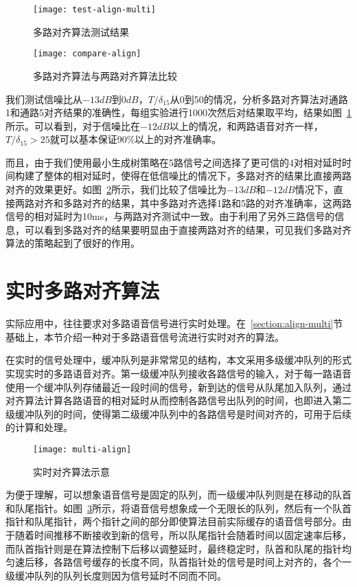 \begin{figure}
\centering
\texttt{[image: test-align-multi]}
\caption{多路对齐算法测试结果\label{fig:test-align-multi}}
\end{figure}

\begin{figure}
\centering
\texttt{[image: compare-align]}
\caption{多路对齐算法与两路对齐算法比较\label{fig:compare-align}}
\end{figure}

我们测试信噪比从$-13dB$到$0dB$，$T/\delta_{15}$从0到50的情况，分析多路对齐算法对通路1和通路5对齐结果的准确性，每组实验进行1000次然后对结果取平均，结果如图~\ref{fig:test-align-multi}所示。可以看到，对于信噪比在$-12dB$以上的情况，和两路语音对齐一样，$T/\delta_{15} > 25$就可以基本保证90\%以上的对齐准确率。

而且，由于我们使用最小生成树策略在5路信号之间选择了更可信的4对相对延时时间构建了整体的相对延时，使得在低信噪比的情况下，多路对齐的结果比直接两路对齐的效果更好。如图~\ref{fig:compare-align}所示，我们比较了信噪比为$-13dB$和$-12dB$情况下，直接两路对齐和多路对齐的结果，其中多路对齐选择1路和5路的对齐准确率，这两路信号的相对延时为10ms，与两路对齐测试中一致。由于利用了另外三路信号的信息，可以看到多路对齐的结果要明显由于直接两路对齐的结果，可见我们多路对齐算法的策略起到了很好的作用。

\section{实时多路对齐算法} \label{section:realtime-align}

实际应用中，往往要求对多路语音信号进行实时处理。在~\ref{section:align-multi}节基础上，本节介绍一种对于多路语音信号流进行实时对齐的算法。

在实时的信号处理中，缓冲队列是非常常见的结构，本文采用多级缓冲队列的形式实现实时的多路语音对齐。第一级缓冲队列接收各路信号的输入，对于每一路语音使用一个缓冲队列存储最近一段时间的信号，新到达的信号从队尾加入队列，通过对齐算法计算各路语音的相对延时从而控制各路信号出队列的时间，也即进入第二级缓冲队列的时间，使得第二级缓冲队列中的各路信号是时间对齐的，可用于后续的计算和处理。

\begin{figure}
\centering
\texttt{[image: multi-align]}
\caption{实时对齐算法示意\label{fig:multi-align}}
\end{figure}

为便于理解，可以想象语音信号是固定的队列，而一级缓冲队列则是在移动的队首和队尾指针。如图~\ref{fig:multi-align}所示，将语音信号想象成一个无限长的队列，然后有一个队首指针和队尾指针，两个指针之间的部分即使算法目前实际缓存的语音信号部分。由于随着时间推移不断接收到新的信号，所以队尾指针会随着时间以固定速率后移，而队首指针则是在算法控制下后移以调整延时，最终稳定时，队首和队尾的指针均匀速后移，各路信号缓存的长度不同，队首指针处的信号是时间上对齐的，各个一级缓冲队列的队列长度则因为信号延时不同而不同。


